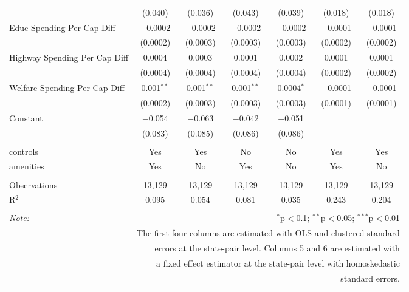 \begin{table}[!htbp]
\begin{tabular}{@{\extracolsep{5pt}}lcccccc}
  & (0.040) & (0.036) & (0.043) & (0.039) & (0.018) & (0.018) \\ 
  Educ Spending Per Cap Diff & $-$0.0002 & $-$0.0002 & $-$0.0002 & $-$0.0002 & $-$0.0001 & $-$0.0001 \\ 
  & (0.0002) & (0.0003) & (0.0003) & (0.0003) & (0.0002) & (0.0002) \\ 
  Highway Spending Per Cap Diff & 0.0004 & 0.0003 & 0.0001 & 0.0002 & 0.0001 & 0.0001 \\ 
  & (0.0004) & (0.0004) & (0.0004) & (0.0004) & (0.0002) & (0.0002) \\ 
  Welfare Spending Per Cap Diff & 0.001$^{**}$ & 0.001$^{**}$ & 0.001$^{**}$ & 0.0004$^{*}$ & $-$0.0001 & $-$0.0001 \\ 
  & (0.0002) & (0.0003) & (0.0003) & (0.0003) & (0.0001) & (0.0001) \\ 
  Constant & $-$0.054 & $-$0.063 & $-$0.042 & $-$0.051 &  &  \\ 
  & (0.083) & (0.085) & (0.086) & (0.086) &  &  \\ 
 \hline \\[-1.8ex] 
controls & Yes & Yes & No & No & Yes & Yes \\ 
amenities & Yes & No & Yes & No & Yes & No \\ 
\hline \\[-1.8ex] 
Observations & 13,129 & 13,129 & 13,129 & 13,129 & 13,129 & 13,129 \\ 
R$^{2}$ & 0.095 & 0.054 & 0.081 & 0.035 & 0.243 & 0.204 \\ 
\hline 
\hline \\[-1.8ex] 
\textit{Note:}  & \multicolumn{6}{r}{$^{*}$p$<$0.1; $^{**}$p$<$0.05; $^{***}$p$<$0.01} \\ 
 & \multicolumn{6}{r}{The first four columns are estimated with OLS and clustered standard} \\ 
 & \multicolumn{6}{r}{ errors at the state-pair level. Columns 5 and 6 are estimated with} \\ 
 & \multicolumn{6}{r}{a fixed effect estimator at the state-pair level with homoskedastic} \\ 
 & \multicolumn{6}{r}{standard errors.} \\ 
\end{tabular} 
\end{table} 
